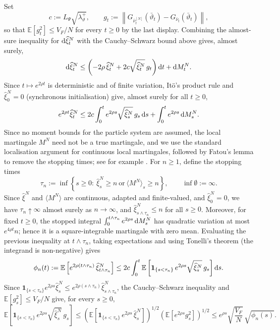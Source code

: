 Set
\[
    c:=L_\Psi\sqrt{\lambda_\vartheta^+},
    \qquad
    g_t:=\left\|
    G_{\bar\nu_t^{[N]}}(\bar\vartheta_t)
    -
    G_{\bar\nu_t}(\bar\vartheta_t)
    \right\|,
\]
so that \(\mathbb E[g_t^2]\le V_F/N\) for every \(t\ge0\) by the last display. Combining the almost-sure inequality for \(\mathrm{d}\widehat\xi_t^N\) with the Cauchy--Schwarz bound above gives, almost surely,
\[
    \mathrm{d}\widehat\xi_t^N
    \le
    \left(-2\rho\,\widehat\xi_t^N+2c\sqrt{\widehat\xi_t^N}\,g_t\right)\mathrm{d} t
    +\mathrm{d} M_t^N .
\]
Since \(t\mapsto e^{2\rho t}\) is deterministic and of finite variation, It\"o's product rule and \(\widehat\xi_0^N=0\) (synchronous initialisation) give, almost surely for all \(t\ge0\),
\[
    e^{2\rho t}\widehat\xi_t^N
    \le
    2c\int_0^t e^{2\rho s}\sqrt{\widehat\xi_s^N}\,g_s\,\mathrm{d} s
    +
    \int_0^t e^{2\rho s}\,\mathrm{d} M_s^N .
\]
Since no moment bounds for the particle system are assumed, the local martingale \(M^N\) need not be a true martingale, and we use the standard localisation argument for continuous local martingales, followed by Fatou's lemma to remove the stopping times; see for example \citet{stochastic_gronwal_lemma}. For \(n\ge1\), define the stopping times
\[
    \tau_n
    :=
    \inf\left\{s\ge0:\ \widehat\xi_s^N\ge n\ \text{or}\ \langle M^N\rangle_s\ge n\right\},
    \qquad
    \inf\emptyset:=\infty .
\]
Since \(\widehat\xi^N\) and \(\langle M^N\rangle\) are continuous, adapted and finite-valued, and \(\widehat\xi_0^N=0\), we have \(\tau_n\uparrow\infty\) almost surely as \(n\to\infty\), and \(\widehat\xi^N_{s\wedge\tau_n}\le n\) for all \(s\ge0\). Moreover, for fixed \(t\ge0\), the stopped integral \(\int_0^{t\wedge\tau_n}e^{2\rho s}\,\mathrm{d} M_s^N\) has quadratic variation at most \(e^{4\rho t}n\); hence it is a square-integrable martingale with zero mean. Evaluating the previous inequality at \(t\wedge\tau_n\), taking expectations and using Tonelli's theorem (the integrand is non-negative) gives
\[
    \phi_n(t)
    :=
    \mathbb E\left[e^{2\rho(t\wedge\tau_n)}\,\widehat\xi^N_{t\wedge\tau_n}\right]
    \le
    2c\int_0^t
    \mathbb E\left[\mathbf 1_{\{s<\tau_n\}}\,e^{2\rho s}\sqrt{\widehat\xi_s^N}\,g_s\right]\mathrm{d} s .
\]
Since \(\mathbf 1_{\{s<\tau_n\}}e^{2\rho s}\widehat\xi_s^N\le e^{2\rho(s\wedge\tau_n)}\widehat\xi^N_{s\wedge\tau_n}\), the Cauchy--Schwarz inequality and \(\mathbb E[g_s^2]\le V_F/N\) give, for every \(s\ge0\),
\[
    \mathbb E\left[\mathbf 1_{\{s<\tau_n\}}\,e^{2\rho s}\sqrt{\widehat\xi_s^N}\,g_s\right]
    \le
    \left(\mathbb E\left[\mathbf 1_{\{s<\tau_n\}}\,e^{2\rho s}\,\widehat\xi_s^N\right]\right)^{1/2}
    \left(\mathbb E\left[e^{2\rho s}g_s^2\right]\right)^{1/2}
    \le
    e^{\rho s}\sqrt{\frac{V_F}{N}}\,\sqrt{\phi_n(s)} .
\]

